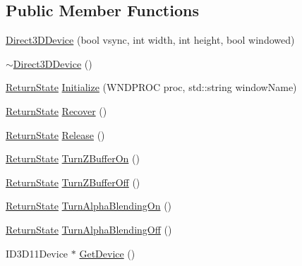 \subsection*{Public Member Functions}
\begin{DoxyCompactItemize}
\item 
\hyperlink{class_osiris_i_1_1_graphics_1_1_devices_1_1_direct3_d_device_aa94a133618d9d167e053f9c71a857efa}{Direct3\-D\-Device} (bool vsync, int width, int height, bool windowed)
\item 
\hyperlink{class_osiris_i_1_1_graphics_1_1_devices_1_1_direct3_d_device_a89c9e2048c904ddd27e30f0bcc319d58}{$\sim$\-Direct3\-D\-Device} ()
\item 
\hyperlink{namespace_osiris_i_a8f53bf938dc75c65c6a529694514013e}{Return\-State} \hyperlink{class_osiris_i_1_1_graphics_1_1_devices_1_1_direct3_d_device_ab81fe1a72803d8cbeda1557ebc682a28}{Initialize} (W\-N\-D\-P\-R\-O\-C proc, std\-::string window\-Name)
\item 
\hyperlink{namespace_osiris_i_a8f53bf938dc75c65c6a529694514013e}{Return\-State} \hyperlink{class_osiris_i_1_1_graphics_1_1_devices_1_1_direct3_d_device_a8e87bb3f6e3546feb268e69be5c005d3}{Recover} ()
\item 
\hyperlink{namespace_osiris_i_a8f53bf938dc75c65c6a529694514013e}{Return\-State} \hyperlink{class_osiris_i_1_1_graphics_1_1_devices_1_1_direct3_d_device_a958576ed48e15737b282e803712c8b27}{Release} ()
\item 
\hyperlink{namespace_osiris_i_a8f53bf938dc75c65c6a529694514013e}{Return\-State} \hyperlink{class_osiris_i_1_1_graphics_1_1_devices_1_1_direct3_d_device_a91e0a937e1a54e3c6566fa91316f5ef2}{Turn\-Z\-Buffer\-On} ()
\item 
\hyperlink{namespace_osiris_i_a8f53bf938dc75c65c6a529694514013e}{Return\-State} \hyperlink{class_osiris_i_1_1_graphics_1_1_devices_1_1_direct3_d_device_a020b0981da0cabb4297014bb560217c2}{Turn\-Z\-Buffer\-Off} ()
\item 
\hyperlink{namespace_osiris_i_a8f53bf938dc75c65c6a529694514013e}{Return\-State} \hyperlink{class_osiris_i_1_1_graphics_1_1_devices_1_1_direct3_d_device_a4ed26cd39997ef59e48af53369a62e46}{Turn\-Alpha\-Blending\-On} ()
\item 
\hyperlink{namespace_osiris_i_a8f53bf938dc75c65c6a529694514013e}{Return\-State} \hyperlink{class_osiris_i_1_1_graphics_1_1_devices_1_1_direct3_d_device_a02e1989f2d0a68357e9d5a84509488cf}{Turn\-Alpha\-Blending\-Off} ()
\item 
I\-D3\-D11\-Device $\ast$ \hyperlink{class_osiris_i_1_1_graphics_1_1_devices_1_1_direct3_d_device_a2d1a8348fb0f5fbac33e5d4a0b34e426}{Get\-Device} ()

\end{DoxyCompactItemize}
